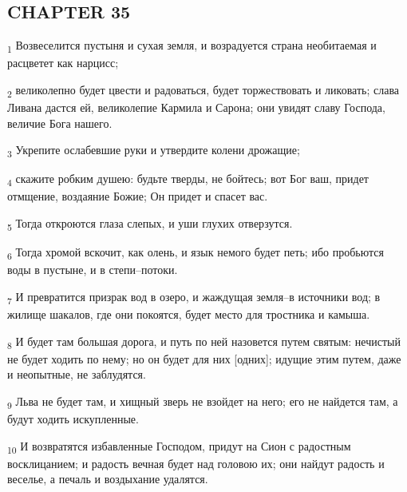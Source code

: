 \subsection{CHAPTER 35}
\begin{tcolorbox}
\textsubscript{1} Возвеселится пустыня и сухая земля, и возрадуется страна необитаемая и расцветет как нарцисс;
\end{tcolorbox}
\begin{tcolorbox}
\textsubscript{2} великолепно будет цвести и радоваться, будет торжествовать и ликовать; слава Ливана дастся ей, великолепие Кармила и Сарона; они увидят славу Господа, величие Бога нашего.
\end{tcolorbox}
\begin{tcolorbox}
\textsubscript{3} Укрепите ослабевшие руки и утвердите колени дрожащие;
\end{tcolorbox}
\begin{tcolorbox}
\textsubscript{4} скажите робким душею: будьте тверды, не бойтесь; вот Бог ваш, придет отмщение, воздаяние Божие; Он придет и спасет вас.
\end{tcolorbox}
\begin{tcolorbox}
\textsubscript{5} Тогда откроются глаза слепых, и уши глухих отверзутся.
\end{tcolorbox}
\begin{tcolorbox}
\textsubscript{6} Тогда хромой вскочит, как олень, и язык немого будет петь; ибо пробьются воды в пустыне, и в степи--потоки.
\end{tcolorbox}
\begin{tcolorbox}
\textsubscript{7} И превратится призрак вод в озеро, и жаждущая земля--в источники вод; в жилище шакалов, где они покоятся, будет место для тростника и камыша.
\end{tcolorbox}
\begin{tcolorbox}
\textsubscript{8} И будет там большая дорога, и путь по ней назовется путем святым: нечистый не будет ходить по нему; но он будет для них [одних]; идущие этим путем, даже и неопытные, не заблудятся.
\end{tcolorbox}
\begin{tcolorbox}
\textsubscript{9} Льва не будет там, и хищный зверь не взойдет на него; его не найдется там, а будут ходить искупленные.
\end{tcolorbox}
\begin{tcolorbox}
\textsubscript{10} И возвратятся избавленные Господом, придут на Сион с радостным восклицанием; и радость вечная будет над головою их; они найдут радость и веселье, а печаль и воздыхание удалятся.
\end{tcolorbox}
